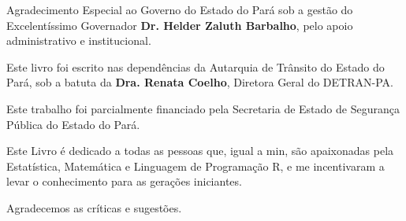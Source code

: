 \begin{refsection}

Agradecimento Especial ao Governo do Estado do Pará sob a gestão do Excelentíssimo Governador \textbf{Dr. Helder Zaluth Barbalho}, pelo apoio administrativo e institucional.
\vst


Este livro foi escrito nas dependências da Autarquia de Trânsito do Estado do Pará, sob a batuta da \textbf{Dra. Renata Coelho}, Diretora Geral do DETRAN-PA.
\vst

Este trabalho foi parcialmente financiado pela Secretaria de Estado de Segurança Pública do Estado do Pará.
\vst

Este Livro é dedicado a todas as pessoas que, igual a min, são apaixonadas pela Estatística, Matemática e Linguagem de Programação R, e me incentivaram a levar o conhecimento para as gerações iniciantes.
\vst

Agradecemos as críticas e sugestões.


\printbibliography[heading=subbibliography]
\end{refsection}